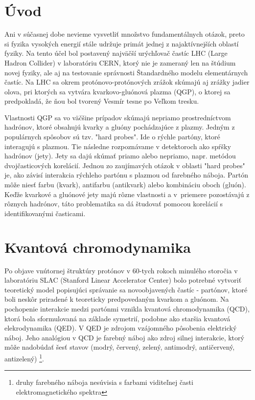 \documentclass[thesismargins, thesislinespacing]{rnthesis}
\begin{document}
\chapter*{Úvod}

Ani v súčasnej dobe nevieme vysvetliť množstvo fundamentálnych otázok, preto si fyzika vysokých energií stále udržuje primát jednej z najaktívnejších oblastí fyziky. Na tento účel bol postavený najväčší urýchľovač častíc LHC (Large Hadron Collider) v laboratóriu CERN, ktorý nie je zameraný len na štúdium novej fyziky, ale aj na testovanie správnosti Štandardného modelu elementárnych častíc. Na LHC sa okrem protónovo-protónových zrážok skúmajú aj zrážky jadier olova, pri ktorých  sa vytvára kvarkovo-gluónová plazma (QGP), o ktorej sa predpokladá, že ňou bol tvorený Vesmír tesne po Veľkom tresku. 

Vlastnosti QGP sa vo väčšine prípadov skúmajú nepriamo prostredníctvom \-had\-ró\-nov, ktoré obsahujú kvarky a gluóny pochádzajúce z plazmy. Jedným z populárnych \-spô\-so\-bov sú tzv. "hard probes". Ide o rýchle partóny, ktoré interagujú s plazmou. Tie následne rozpoznávame v detektoroch ako spŕšky hadrónov (jety). Jety sa dajú skúmať \-pria\-mo alebo nepriamo, napr. metódou dvojčasticových korelácií. Jednou zo zaujímavých otázok v oblasti "hard probes" \-je, ako závisí interakcia rýchleho partónu s plazmou od farebného náboja. Partón môže niesť farbu (kvark), antifarbu (antikvark) alebo kombináciu oboch (gluón). Keďže kvarkové a gluónové jety majú rôzne vlastnosti a v~priemere pozostávajú z rôznych hadrónov, táto problematika sa dá študovať pomocou korelácií s identifikovanými časticami.  

\chapter{Kvantová chromodynamika}

Po objave vnútornej štruktúry protónov v 60-tych rokoch minulého storočia v laboratóriu SLAC (Stanford Linear Accelerator Center) bolo potrebné vytvoriť teoretický model popisujúci správanie sa novoobjavených častíc - partónov, ktoré boli neskôr priradené k teoreticky predpovedaným kvarkom a gluónom. Na pochopenie interakcie medzi partónmi vznikla kvantová chromodynamika (QCD), ktorá bola sformulovaná na základe symetrií, podobne ako staršia kvantová elekrodynamika (QED). V QED je zdrojom vzájomného pôsobenia elektrický náboj. Jeho analógiou v QCD je farebný náboj ako zdroj silnej interakcie, ktorý môže nadobúdať šesť stavov (modrý, červený, zelený, antimodrý, antičervený, antizelený) \footnote{druhy farebného náboja nesúvisia s farbami viditeľnej časti elektromagnetického spektra}.
\end{document}

